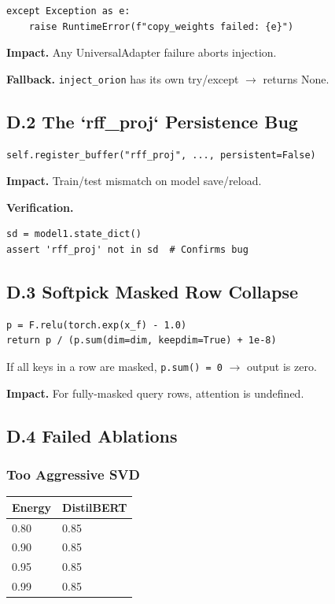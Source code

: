 \begin{lstlisting}
except Exception as e:
    raise RuntimeError(f"copy_weights failed: {e}")
\end{lstlisting}

\textbf{Impact.} Any UniversalAdapter failure aborts injection.

\textbf{Fallback.} \texttt{inject\_orion} has its own try/except $\to$ returns None.

\subsection{D.2 The `rff\_proj` Persistence Bug}

\begin{lstlisting}
self.register_buffer("rff_proj", ..., persistent=False)
\end{lstlisting}

\textbf{Impact.} Train/test mismatch on model save/reload.

\textbf{Verification.}

\begin{lstlisting}
sd = model1.state_dict()
assert 'rff_proj' not in sd  # Confirms bug
\end{lstlisting}

\subsection{D.3 Softpick Masked Row Collapse}

\begin{lstlisting}
p = F.relu(torch.exp(x_f) - 1.0)
return p / (p.sum(dim=dim, keepdim=True) + 1e-8)
\end{lstlisting}

If all keys in a row are masked, \texttt{p.sum() = 0} $\to$ output is zero.

\textbf{Impact.} For fully-masked query rows, attention is undefined.

\subsection{D.4 Failed Ablations}

\subsubsection{Too Aggressive SVD}

\begin{table}[H]
\centering
\small
\begin{tabular}{ll}
\toprule
\textbf{Energy} & \textbf{DistilBERT} \\
\midrule
0.80 & 0.85 \\
0.90 & 0.85 \\
0.95 & 0.85 \\
0.99 & 0.85 \\
\bottomrule
\end{tabular}
\end{table}

